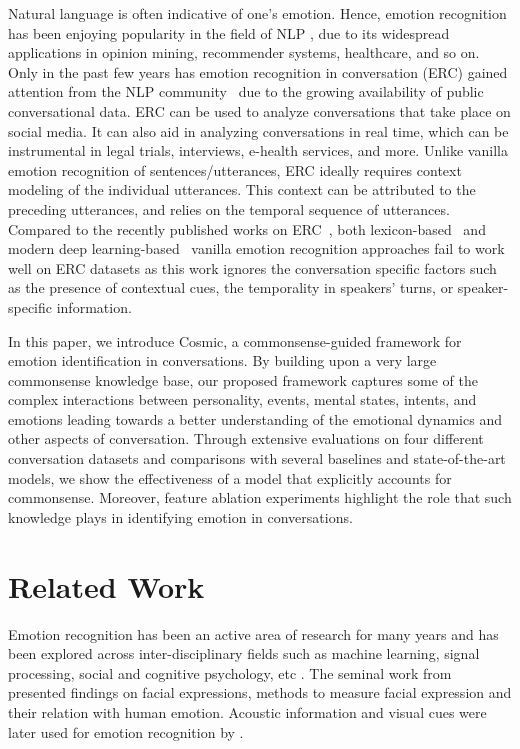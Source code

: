 \documentclass[11pt,a4paper]{article}
\begin{document}
Natural language is
often indicative of one's emotion. Hence, emotion recognition has
been enjoying popularity in the field of NLP  \citep{kratzwald2018decision, colneric2018emotion}, due to its widespread applications in
opinion mining, recommender systems, healthcare, and so on. Only in the past few years has emotion recognition in conversation (ERC) gained attention from the NLP community~\citep{yeh2019interaction, chen2018emotionlines,dialoguernn,zhou2018emotional}
due to the growing availability of public conversational data. ERC can be used to analyze
conversations that take place on social media. It can also aid in analyzing conversations in real time, which can be instrumental in legal trials, interviews, e-health services, and more. Unlike vanilla emotion recognition of sentences/utterances, ERC ideally requires context
modeling of the individual utterances. This context can be attributed to the preceding
utterances, and relies on the temporal sequence of utterances.
Compared to the recently published works on ERC~\citep{chen2018emotionlines,dialoguernn,zhou2018emotional, qindcr2020dcrnet,zhong2019knowledge,zhang2019modeling}, both lexicon-based~\citep{wu2006emotion,mohammad2010emotions, shaheen2014emotion} and modern deep learning-based~\citep{kratzwald2018decision, colneric2018emotion} vanilla emotion recognition approaches fail to work well on ERC datasets as this work ignores the conversation specific factors such as the presence of contextual cues, the temporality in speakers' turns, or speaker-specific information.


In this paper, we introduce {\sc Cosmic}, a commonsense-guided framework for emotion identification in conversations. By building upon a very large commonsense knowledge base, our proposed framework captures some of the complex interactions between personality, events, mental states, intents, and emotions leading towards a better understanding of the emotional dynamics and other aspects of conversation. Through extensive evaluations on four different conversation datasets and comparisons with several baselines and state-of-the-art models, we show the effectiveness of a model that explicitly accounts for commonsense. Moreover, feature ablation experiments highlight the role that such knowledge plays in identifying emotion in conversations.



\section{Related Work}
\label{sec:related-works}
Emotion recognition has been an active area of research for many years and has been explored across inter-disciplinary fields such as machine learning, signal processing, social and cognitive psychology, etc \cite{picard2010affective}. The seminal work from \citet{ekman1993facial} presented findings on facial expressions, methods to measure facial expression and their relation with human emotion. Acoustic information and visual cues were later used for emotion recognition by \citet{datcu2014semantic}.
\end{document}
